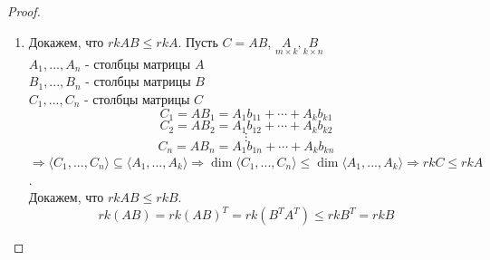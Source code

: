 \documentclass[a4paper, 12pt]{article}
\theoremstyle{definition}
\begin{document}
\begin{proof}
\begin{enumerate}
      \item Докажем, что $rkAB \leq rkA$. Пусть $C =AB$, $\underset{m \times k}{A}, \underset{k \times n}{B}$ \\
      $A_1,...,A_n$ - столбцы матрицы $A$ \\
      $B_1,...,B_n$ - столбцы матрицы $B$ \\
      $C_1,...,C_n$ - столбцы матрицы $C$
      $$C_1 = AB_1 = A_1b_{11} + \cdots + A_kb_{k1}$$ 
      $$C_2 = AB_2 = A_1b_{12} + \cdots + A_kb_{k2}$$
      $$\vdots$$
      $$C_n = AB_n = A_1b_{1n} + \cdots + A_kb_{kn}$$
      $\Longrightarrow \langle C_1,...,C_n \rangle \subseteq \langle A_1,...,A_k \rangle \Longrightarrow \dim\langle C_1,...,C_n \rangle \leq \dim\langle A_1,...,A_k \rangle \Longrightarrow rkC\leq rkA$. \\
      Докажем, что $rkAB \leq rkB$.
      $$rk(AB) = rk(AB)^T = rk(B^TA^T) \leq rkB^T = rkB$$ 
    \end{enumerate}
  \end{proof} 
\end{document}
